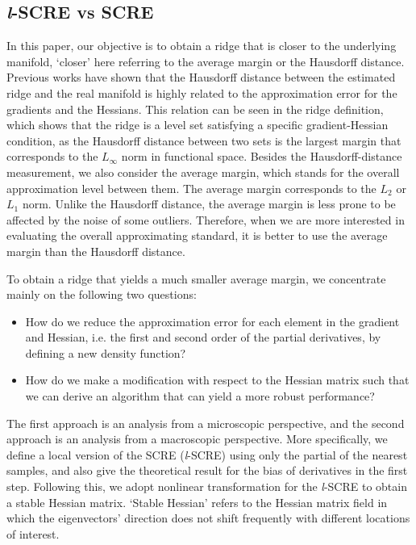 \documentclass[aos,preprint]{imsart}
\theoremstyle{remark}
\begin{document}
\subsection{{\it l}-SCRE vs SCRE}
In this paper, our objective is to obtain a ridge that is closer to the underlying manifold, `closer' here referring to the average margin or the Hausdorff distance. Previous works have shown that the Hausdorff distance between the estimated ridge and the real manifold is highly related to the approximation error for the gradients and the Hessians. This relation can be seen in the ridge definition, which shows that the ridge is a level set satisfying a specific gradient-Hessian condition, as the Hausdorff distance between two sets is the largest margin that corresponds to the $L_{\infty}$ norm in functional space. Besides the Hausdorff-distance measurement, we also consider the average margin, which stands for the overall approximation level between them. The average margin corresponds to the $L_2$ or $L_1$ norm. Unlike the Hausdorff distance, the average margin is less prone to be affected by the noise of some outliers. Therefore, when we are more interested in evaluating the overall approximating standard, it is better to use the average margin than the Hausdorff distance.

To obtain a ridge that yields a much smaller average margin, we concentrate mainly on the following two questions:
\begin{itemize}
\item How do we reduce the approximation error for each element in the gradient and Hessian, i.e. the first and second order of the partial derivatives, by defining a new density function?
\item How do we make a modification with respect to the Hessian matrix such that we can derive an algorithm that can yield a more robust performance?
\end{itemize}


The first approach is an analysis from a microscopic perspective, and the second approach is an analysis from a macroscopic perspective.
More specifically, we define a local version of the SCRE ({\it l}-SCRE) using only the partial of the nearest samples, and also give the theoretical result for the bias of derivatives in the first step. Following this, we adopt nonlinear transformation for the {\it l}-SCRE to obtain a stable Hessian matrix. `Stable Hessian' refers to the Hessian matrix field in which the eigenvectors' direction does not shift frequently with different locations of interest.
\end{document}
